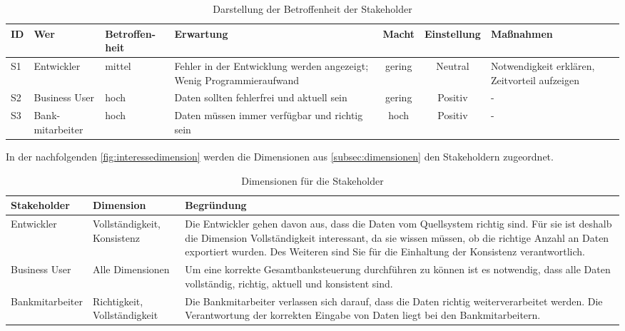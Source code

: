 \begin{table}[ht]
\begin{tabular}[ht]{l|p{2cm}|>{\centering}p{1.5cm}|p{2.5cm}|c|c|p{2.3cm}}
ID & Wer        & Betroffen-heit & Erwartung & Macht & Einstellung & Maßnahmen  \\ \hline
S1 & Entwickler & mittel         & Fehler in der Entwicklung werden angezeigt; Wenig Programmieraufwand & gering & Neutral & Notwendigkeit erklären, Zeitvorteil aufzeigen  \\ \hline
S2 & Business User & hoch    & Daten sollten fehlerfrei und aktuell sein & gering & Positiv & - \\ \hline
S3 & Bank-mitarbeiter & hoch         & Daten müssen immer verfügbar und richtig sein & hoch & Positiv & -  \\
\end{tabular}
\caption{Darstellung der Betroffenheit der Stakeholder}
\label{fig:betroffenheitsanalyse}
\end{table}

In der nachfolgenden \autoref{fig:interessedimension} werden die Dimensionen aus \autoref{subsec:dimensionen} den Stakeholdern zugeordnet.
\begin{table}[ht]
\begin{tabular}[h]{l|p{3cm}|p{7.7cm}}
Stakeholder & Dimension & Begründung \\ \hline
Entwickler & Vollständigkeit, Konsistenz & Die Entwickler gehen davon aus, dass die Daten vom Quellsystem richtig sind. Für sie ist deshalb die Dimension Vollständigkeit interessant, da sie wissen müssen, ob die richtige Anzahl an Daten exportiert wurden. Des Weiteren sind Sie für die Einhaltung der Konsistenz verantwortlich. \\ \hline
Business User & Alle Dimensionen & Um eine korrekte Gesamtbanksteuerung durchführen zu können ist es notwendig, dass alle Daten vollständig, richtig, aktuell und konsistent sind.  \\ \hline
Bankmitarbeiter & Richtigkeit, Vollständigkeit & Die Bankmitarbeiter verlassen sich darauf, dass die Daten richtig weiterverarbeitet werden. Die Verantwortung der korrekten Eingabe von Daten liegt bei den Bankmitarbeitern. \\
\end{tabular}
\caption{Dimensionen für die Stakeholder}
\label{fig:interessedimension}
\end{table}


